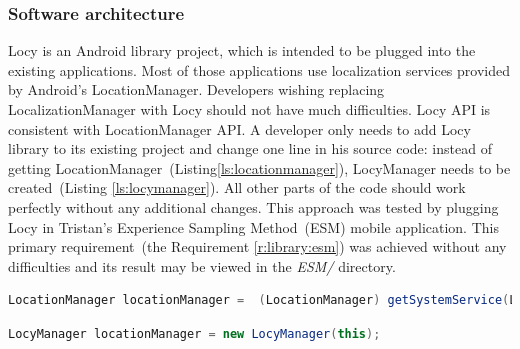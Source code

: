 \subsubsection{Software architecture}
\label{s:design:locy:architecture}
\hspace{10pt}Locy is an Android library project, which is intended to be plugged into the existing applications. Most of those applications use localization services provided by Android's LocationManager. Developers wishing replacing LocalizationManager with Locy should not have much difficulties. Locy API is consistent with LocationManager API. A developer only needs to add Locy library to its existing project and change one line in his source code: instead of getting LocationManager\ (Listing\ref{ls:locationmanager}), LocyManager needs to be created\ (Listing \ref{ls:locymanager}). All other parts of the code should work perfectly without any additional changes. This approach was tested by plugging Locy in Tristan's Experience Sampling Method\ (ESM) mobile application. This primary requirement\ (the Requirement \ref{r:library:esm}) was achieved without any difficulties and its result may be viewed in the \textit{ESM/} directory.

                 
\begin{lstlisting}[language=Java,
       basicstyle=\ttfamily,
       keywordstyle=\color{blue}\ttfamily,
       stringstyle=\color{red}\ttfamily,
       commentstyle=\color{green}\ttfamily,
      breaklines=true,
      frame=single,    
      label=ls:locationmanager,caption=Localization services with LocationManager.]
LocationManager locationManager =  (LocationManager) getSystemService(LOCATION_SERVICE);
\end{lstlisting}

\begin{lstlisting}[language=Java,
       basicstyle=\ttfamily,
       keywordstyle=\color{blue}\ttfamily,
       stringstyle=\color{red}\ttfamily,
       commentstyle=\color{green}\ttfamily,
      breaklines=true,
      frame=single,    
      label=ls:locymanager,caption=Localization services with LocyManager.]
LocyManager locationManager = new LocyManager(this);
\end{lstlisting}


